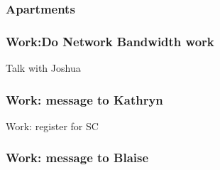 \begin{frame}[label=apts]
\frametitle{Apartments}
\end{frame}

\begin{frame}
\frametitle{Work:Do Network Bandwidth work} 
\end{frame}

\begin{frame}[label=]{Talk with Joshua}
\end{frame} 

\begin{frame}[label=kathrynMsg]
\frametitle{Work: message to Kathryn}
\begin{outline}[enumerate]
\tiny \1 \tiny
\end{outline}
\end{frame} 


\begin{frame}{Work: register for SC} 

\end{frame}


\begin{frame}{}
\frametitle{  }

\end{frame}

\begin{frame}[label=BlaiseMessage]
\frametitle{Work: message to Blaise} 
\end{frame}
